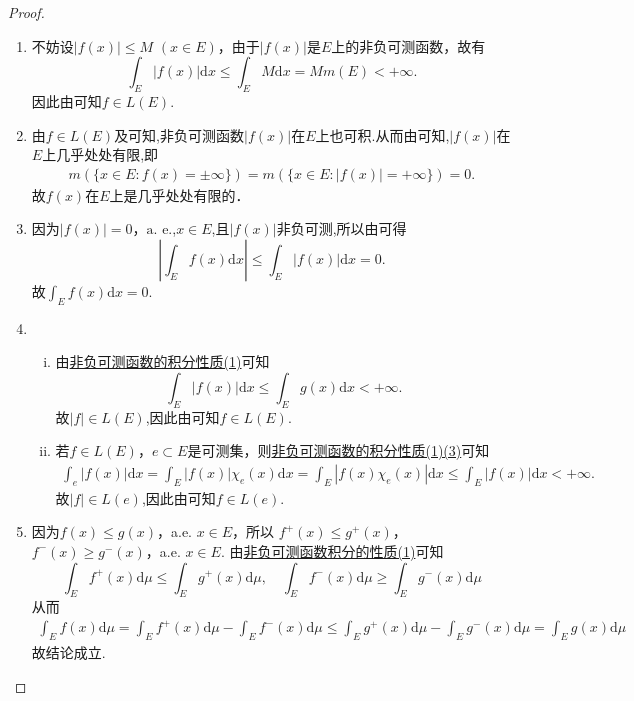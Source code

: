 \documentclass[../../main.tex]{subfiles}
\begin{document}
\begin{proof}
\begin{enumerate}[(1)]
\item 不妨设\(|f(x)| \leqslant M\) \((x \in E)\)，由于\(|f(x)|\)是\(E\)上的非负可测函数，故有
\[
\int_E |f(x)| \mathrm{d}x \leqslant \int_E M \mathrm{d}x = M m(E) < +\infty.
\]
因此由可知$f \in L(E).$

\item 由$f\in L(E)$及可知,非负可测函数$|f(x)|$在$E$上也可积.从而由可知,$|f(x)|$在$E$上几乎处处有限,即
\begin{align*}
m(\{x\in E:f(x)=\pm \infty\})=m(\{x\in E:|f(x)|=+\infty\})=0.
\end{align*}
故\(f(x)\)在\(E\)上是几乎处处有限的．

\item 因为\(|f(x)| = 0\)，\(\text{a. e.}\),$x\in E$,且$|f(x)|$非负可测,所以由可得
\[
\left| \int_E f(x) \mathrm{d}x \right| \leqslant \int_E |f(x)| \mathrm{d}x = 0.
\]
故$\int_E f(x) \mathrm{d}x = 0.$

\item \begin{enumerate}[(i)]
\item 由\hyperref[theorem:非负可测函数积分的性质]{非负可测函数的积分性质(1)}可知
\[
\int_E |f(x)| \mathrm{d}x \leqslant \int_E g(x) \mathrm{d}x < +\infty.
\]
故$|f|\in L(E)$,因此由可知$f \in L(E).$

\item 若\(f \in L(E)\)，\(e \subset E\)是可测集，则\hyperref[theorem:非负可测函数积分的性质]{非负可测函数的积分性质(1)(3)}可知
\begin{align*}
\int_e{\left| f\left( x \right) \right|\mathrm{d}x}=\int_E{\left| f\left( x \right) \right|\chi _e\left( x \right) \mathrm{d}x}=\int_E{\left| f\left( x \right) \chi _e\left( x \right) \right|\mathrm{d}x}\leqslant \int_E{\left| f\left( x \right) \right|\mathrm{d}x}<+\infty .
\end{align*}
故$|f|\in L(e)$,因此由可知$f \in L(e).$
\end{enumerate}

\item 因为\( f(x) \leqslant g(x) \)，a.e. \( x \in E \)，所以 \( f^+(x) \leqslant g^+(x) \)，\( f^-(x) \geqslant g^-(x) \)，a.e. \( x \in E \). 由\hyperref[theorem:非负可测函数积分的性质]{非负可测函数积分的性质(1)}可知
\[
\int_E f^+(x)\mathrm{d}\mu \leqslant \int_E g^+(x)\mathrm{d}\mu, \quad \int_E f^-(x)\mathrm{d}\mu \geqslant \int_E g^-(x)\mathrm{d}\mu
\]
从而
\begin{align*}
\int_E f(x)\mathrm{d}\mu = \int_E f^+(x)\mathrm{d}\mu - \int_E f^-(x)\mathrm{d}\mu 
\leqslant \int_E g^+(x)\mathrm{d}\mu - \int_E g^-(x)\mathrm{d}\mu = \int_E g(x)\mathrm{d}\mu
\end{align*}
故结论成立.


\end{enumerate}
\end{proof}
\end{document}

